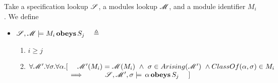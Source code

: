  \begin{definition}
 Take a specification lookup ${\mathcal{S}}$, a modules lookup ${\mathcal M}$, and a module identifier $M_i$. We define
 
 \begin{itemize}
 \item
 ${\mathcal{S}}, {\mathcal M} \models M_i\, \textbf{obeys} \, S_j\ \ \  \triangleq$ 
 
 \begin{enumerate}
 \item
 $i\geq j $ %
 \item 
 $\forall {\mathcal M}'.\forall \sigma.\forall \alpha.[\ \ \ \  {\mathcal M}' (M_i)={\mathcal M} (M_i)\ \wedge\  \sigma \in Arising({\mathcal M}') \ \wedge ClassOf(\alpha,\sigma)\in M_i$\\
 $  \strut \hspace{2cm}\Longrightarrow \ \ \  \ \ 
\ \ \ \  \satLong \Spec {\Mod'} \sigma {\obeys \alpha {S_j}}\ \ \ \ ]$

\end{enumerate}
\end{itemize}

 \end{definition} 
 
  
 
 
 
 
 
